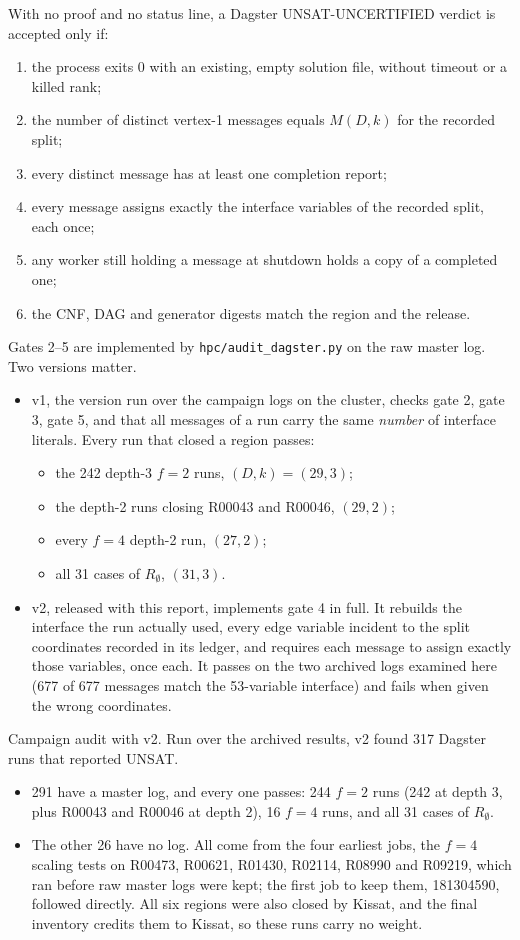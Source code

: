 \documentclass[11pt,a4paper]{article}
\theoremstyle{definition}
\newcommand{\code}[1]{\texttt{#1}}
\newcommand{\st}[1]{\textsf{#1}}
\begin{document}
With no proof and no status line, a Dagster \st{UNSAT-UNCERTIFIED} verdict is accepted only if:
\begin{enumerate}
\item the process exits 0 with an existing, empty solution file, without timeout or a killed rank;
\item the number of distinct vertex-1 messages equals $M(D,k)$ for the recorded split;
\item every distinct message has at least one completion report;
\item every message assigns exactly the interface variables of the recorded split, each once;
\item any worker still holding a message at shutdown holds a copy of a completed one;
\item the CNF, DAG and generator digests match the region and the release.
\end{enumerate}
Gates 2--5 are implemented by \code{hpc/audit\_dagster.py} on the raw master log. Two versions
matter.
\begin{itemize}
\item v1, the version run over the campaign logs on the cluster, checks gate 2, gate 3,
gate 5, and that all messages of a run carry the same \emph{number} of interface literals. Every
run that closed a region passes:
\begin{itemize}
\item the 242 depth-3 $f=2$ runs, $(D,k)=(29,3)$;
\item the depth-2 runs closing R00043 and R00046, $(29,2)$;
\item every $f=4$ depth-2 run, $(27,2)$;
\item all 31 cases of $R_\emptyset$, $(31,3)$.
\end{itemize}
\item v2, released with this report, implements gate 4 in full. It rebuilds the
interface the run actually used, every edge variable incident to the split coordinates recorded
in its ledger, and requires each message to assign exactly those variables, once each. It passes
on the two archived logs examined here (677 of 677 messages match the 53-variable interface) and
fails when given the wrong coordinates.
\end{itemize}
Campaign audit with v2. Run over the archived results, v2 found 317 Dagster runs that
reported UNSAT.
\begin{itemize}
\item 291 have a master log, and every one passes: 244 $f=2$ runs (242 at depth 3, plus
R00043 and R00046 at depth 2), 16 $f=4$ runs, and all 31 cases of $R_\emptyset$.
\item The other 26 have no log. All come from the four earliest jobs, the $f=4$ scaling tests on
R00473, R00621, R01430, R02114, R08990 and R09219, which ran before raw master logs were kept;
the first job to keep them, 181304590, followed directly. All six regions were also closed by
Kissat, and the final inventory credits them to Kissat, so these runs carry no weight.
\end{itemize}
\end{document}
